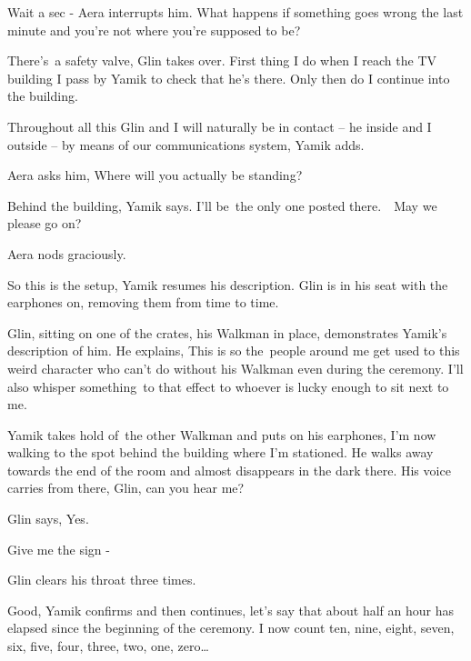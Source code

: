\documentclass[twoside,11pt]{book}
\begin{document}
{\textquotedbl}Wait a sec - {\textquotedbl} Aera interrupts him. {\textquotedbl}What happens if something goes wrong the
last minute and you're not where you're supposed to be?{\textquotedbl} 

{\textquotedbl}There's~a safety valve,{\textquotedbl} Glin takes over. {\textquotedbl}First thing I do when I reach the
TV building I pass by Yamik to check that he's there. Only then do I continue into the building.{\textquotedbl} 

{\textquotedbl}Throughout all this Glin and I will naturally be in contact -- he inside and I outside --  by means of
our communications system,{\textquotedbl} Yamik adds.

Aera asks him, {\textquotedbl}Where will you actually be standing?{\textquotedbl} 

{\textquotedbl}Behind the building,{\textquotedbl} Yamik says. {\textquotedbl}I'll be~the only one posted
there.{\ \ }May we please go on?{\textquotedbl}\ \ 

Aera nods graciously.

{\textquotedbl}So this is the setup,{\textquotedbl} Yamik resumes his description. {\textquotedbl}Glin is in his seat
with the earphones on, removing them from time to time.{\textquotedbl} 

Glin, sitting on one of the crates, his Walkman in place, demonstrates Yamik's description of him. He explains,
{\textquotedbl}This is so the{\ }people around me get used to this weird
character who can't do without his Walkman even during the ceremony. I'll also whisper something~to that effect to
whoever is lucky enough to sit next to me.{\textquotedbl} 

Yamik takes hold of~the other Walkman and puts on his earphones, {\textquotedbl}I'm now walking to the spot behind the
building where I'm stationed.{\textquotedbl} He walks away towards the end of the room and almost disappears in the
dark there. His voice carries from there, {\textquotedbl}Glin, can you hear me?{\textquotedbl} 

Glin says, {\textquotedbl}Yes.{\textquotedbl} 

{\textquotedbl}Give me the sign -{\textquotedbl}

Glin clears his throat three times. 

{\textquotedbl}Good,{\textquotedbl} Yamik confirms and then continues, {\textquotedbl}let's say that about half an hour
has elapsed since the beginning of the ceremony. I now count ten, nine, eight, seven, six, five, four, three, two, one,
zero{\dots}{\textquotedbl} 
\end{document}
